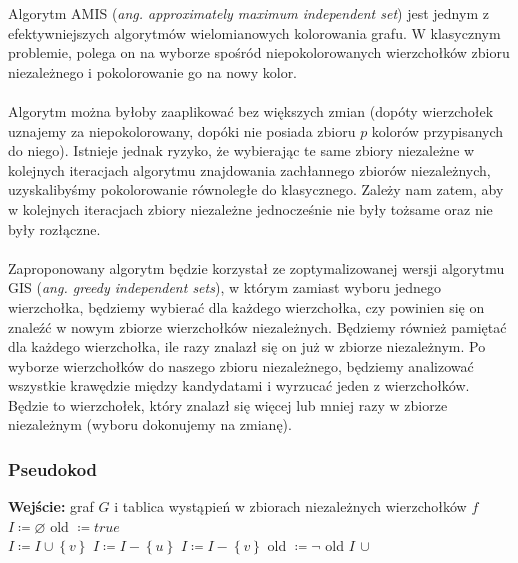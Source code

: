 \documentclass[10pt,a4paper]{article}
\begin{document}
	Algorytm AMIS (\textit{ang. approximately maximum independent set}) jest jednym z efektywniejszych algorytmów wielomianowych kolorowania grafu. W klasycznym problemie, polega on na wyborze spośród niepokolorowanych wierzchołków zbioru niezależnego i pokolorowanie go na nowy kolor. \\~\\
	Algorytm można byłoby zaaplikować bez większych zmian (dopóty wierzchołek uznajemy za niepokolorowany, dopóki nie posiada zbioru $p$ kolorów przypisanych do niego). Istnieje jednak ryzyko, że wybierając te same zbiory niezależne w kolejnych iteracjach algorytmu znajdowania zachłannego zbiorów niezależnych, uzyskalibyśmy pokolorowanie równoległe do klasycznego. Zależy nam zatem, aby w kolejnych iteracjach zbiory niezależne jednocześnie  nie były tożsame oraz nie były rozłączne. \\~\\
	Zaproponowany algorytm będzie korzystał ze zoptymalizowanej wersji algorytmu GIS (\textit{ang. greedy independent sets}), w którym zamiast wyboru jednego wierzchołka, będziemy wybierać dla każdego wierzchołka, czy powinien się on znaleźć w nowym zbiorze wierzchołków niezależnych. Będziemy również pamiętać dla każdego wierzchołka, ile razy znalazł się on już w zbiorze niezależnym. Po wyborze wierzchołków do naszego zbioru niezależnego, będziemy analizować wszystkie krawędzie między kandydatami i wyrzucać jeden z wierzchołków. Będzie to wierzchołek, który znalazł się więcej lub mniej razy w zbiorze niezależnym (wyboru dokonujemy na zmianę).
	
	\subsubsection{Pseudokod}
	
	\begin{algorithmic}
		\State \textbf{Wejście:} graf $G$ i tablica wystąpień w zbiorach niezależnych wierzchołków $f$
		\\
			\State $I \coloneqq \varnothing$
			\State old $\coloneqq true$
			\\
					\State $I \coloneqq I \cup \left\{v\right\}$
				\EndIf
			\EndFor
						\State $I \coloneqq I - \left\{u\right\}$
					\Else
						\State $I \coloneqq I - \left\{v\right\}$
					\EndIf
					\State old $\coloneqq \neg$ old
				\EndIf
			\EndFor
			\State \Return $I \, \cup \, $ 
		\EndFunction
	\end{algorithmic}
	
\end{document}
